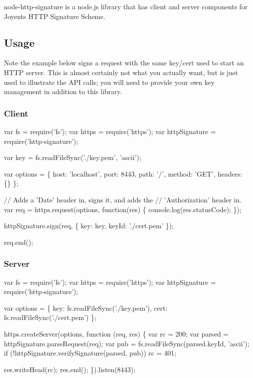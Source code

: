 node-\/http-\/signature is a node.\+js library that has client and server components for Joyent\textquotesingle{}s H\+T\+TP Signature Scheme.

\subsection*{Usage}

Note the example below signs a request with the same key/cert used to start an H\+T\+TP server. This is almost certainly not what you actually want, but is just used to illustrate the A\+PI calls; you will need to provide your own key management in addition to this library.

\subsubsection*{Client}


\begin{DoxyCode}
var fs = require('fs');
var https = require('https');
var httpSignature = require('http-signature');

var key = fs.readFileSync('./key.pem', 'ascii');

var options = \{
  host: 'localhost',
  port: 8443,
  path: '/',
  method: 'GET',
  headers: \{\}
\};

// Adds a 'Date' header in, signs it, and adds the
// 'Authorization' header in.
var req = https.request(options, function(res) \{
  console.log(res.statusCode);
\});


httpSignature.sign(req, \{
  key: key,
  keyId: './cert.pem'
\});

req.end();
\end{DoxyCode}


\subsubsection*{Server}


\begin{DoxyCode}
var fs = require('fs');
var https = require('https');
var httpSignature = require('http-signature');

var options = \{
  key: fs.readFileSync('./key.pem'),
  cert: fs.readFileSync('./cert.pem')
\};

https.createServer(options, function (req, res) \{
  var rc = 200;
  var parsed = httpSignature.parseRequest(req);
  var pub = fs.readFileSync(parsed.keyId, 'ascii');
  if (!httpSignature.verifySignature(parsed, pub))
    rc = 401;

  res.writeHead(rc);
  res.end();
\}).listen(8443);
\end{DoxyCode}


